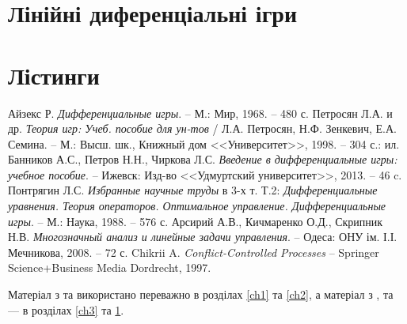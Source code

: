 \documentclass{extreport}
\begin{document}
    \chapter{Лінійні диференціальні ігри}\label{ch4}
        
    \chapter*{Лістинги}
        

    
    \begin{thebibliography}{6}
         Айзекс Р. \emph{Дифференциальные игры}. -- М.: Мир, 1968. -- 480 с.
         Петросян Л.А. и др. \emph{Теория игр: Учеб. пособие для ун-тов }/ Л.А. Петросян, Н.Ф. Зенкевич, Е.А. Семина. -- М.: Высш. шк.,
        Книжный дом <<Университет>>, 1998. -- 304 с.: ил.
         Банников А.С., Петров Н.Н., Чиркова Л.С. \emph{Введение в дифференциальные игры: учебное пособие}. -- Ижевск: Изд-во 
        <<Удмуртский университет>>, 2013. -- 46 c.
         Понтрягин Л.С. \emph{Избранные научные труды} в 3-х т. Т.2: \emph{Дифференциальные уравнения. Теория операторов. Оптимальное управление. Дифференциальные игры}. --
        М.: Наука, 1988. -- 576 с.
         Арсирий А.В., Кичмаренко О.Д., Скрипник Н.В. \emph{Многозначный анализ и линейные задачи управления}. -- Одеса: ОНУ ім. І.І. Мечникова, 2008. -- 72 с.
         Chikrii A. \emph{Conflict-Controlled Processes} -- Springer Science+Business Media Dordrecht, 1997.
    \end{thebibliography}
    Матеріал з \cite{1} та \cite{2} використано переважно в розділах \ref{ch1} та \ref{ch2},
    а матеріал з \cite{3}, \cite{4} та \cite{5} --- в розділах \ref{ch3} та \ref{ch4}.
\end{document}
